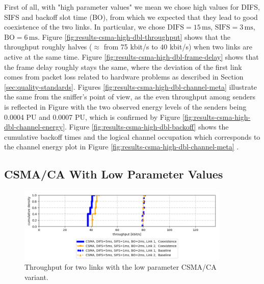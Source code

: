 First of all, with "high parameter values" we mean we chose high values for DIFS, SIFS and backoff slot time (BO), from which we expected that they lead to good coexistence of the two links. In particular, we chose $\text{DIFS}=15 \,\text{ms}$, $\text{SIFS}=3 \,\text{ms}$, $\text{BO}=6 \,\text{ms}$. Figure \ref{fig:results-csma-high-dbl-throughput} shows that the throughput roughly halves ($\approx$ from 75 kbit/s to 40 kbit/s) when two links are active at the same time. Figure \ref{fig:results-csma-high-dbl-frame-delay} shows that the frame delay roughly stays the same, where the deviation of the first link comes from packet loss related to hardware problems as described in Section \ref{sec:quality-standards}. Figures \ref{fig:results-csma-high-dbl-channel-meta} illustrate the same from the sniffer's point of view, as the even throughput among senders is reflected in Figure  with the two observed energy levels of the senders being 0.0004 PU and 0.0007 PU, which is confirmed by Figure \ref{fig:results-csma-high-dbl-channel-energy}. Figure \ref{fig:results-csma-high-dbl-backoff} shows the cumulative backoff times and the logical channel occupation which corresponds to the channel energy plot in Figure \ref{fig:results-csma-high-dbl-channel-meta} . 

\clearpage

\subsection{CSMA/CA With Low Parameter Values}
\label{sec:csma-dbl-low}

\begin{figure}[tb]
	\label{fig:results-csma-low-dbl-throughput}
	\begin{center}
		\includegraphics[width=0.9\textwidth]{pictures/results/same_combinations/csma_low_params/throughput_cdf}
	\end{center}
	\caption{Throughput for two links with the low parameter CSMA/CA variant.}
\end{figure}

